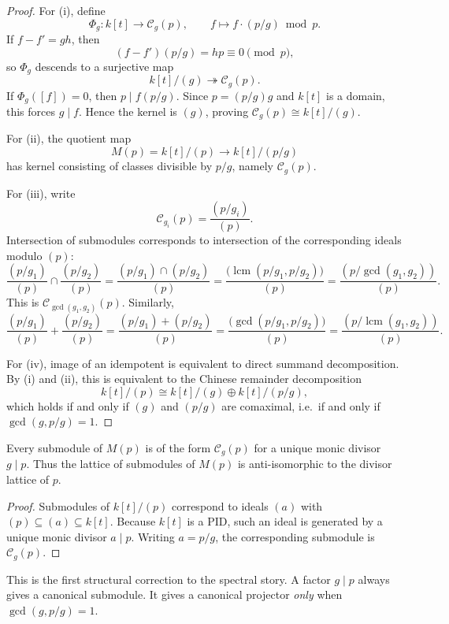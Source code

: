 \begin{proof}
For \textup{(i)}, define
\[
\Phi_g\colon k[t]\to \mathcal C_g(p),\qquad f\mapsto f\cdot (p/g)\bmod p.
\]
If \(f-f'=gh\), then
\[
(f-f')(p/g)=hp\equiv 0\pmod p,
\]
so \(\Phi_g\) descends to a surjective map
\[
k[t]/(g)\twoheadrightarrow \mathcal C_g(p).
\]
If \(\Phi_g([f])=0\), then \(p\mid f(p/g)\). Since \(p=(p/g)g\) and \(k[t]\) is a domain, this forces \(g\mid f\).
Hence the kernel is \((g)\), proving \(\mathcal C_g(p)\cong k[t]/(g)\).

For \textup{(ii)}, the quotient map
\[
M(p)=k[t]/(p)\longrightarrow k[t]/(p/g)
\]
has kernel consisting of classes divisible by \(p/g\), namely \(\mathcal C_g(p)\).

For \textup{(iii)}, write
\[
\mathcal C_{g_i}(p)=\frac{(p/g_i)}{(p)}.
\]
Intersection of submodules corresponds to intersection of the corresponding ideals modulo \((p)\):
\[
\frac{(p/g_1)}{(p)}\cap \frac{(p/g_2)}{(p)}
=\frac{(p/g_1)\cap (p/g_2)}{(p)}
=\frac{\bigl(\operatorname{lcm}(p/g_1,p/g_2)\bigr)}{(p)}
=\frac{(p/\gcd(g_1,g_2))}{(p)}.
\]
This is \(\mathcal C_{\gcd(g_1,g_2)}(p)\).
Similarly,
\[
\frac{(p/g_1)}{(p)}+\frac{(p/g_2)}{(p)}
=\frac{(p/g_1)+(p/g_2)}{(p)}
=\frac{\bigl(\gcd(p/g_1,p/g_2)\bigr)}{(p)}
=\frac{(p/\operatorname{lcm}(g_1,g_2))}{(p)}.
\]

For \textup{(iv)}, image of an idempotent is equivalent to direct summand decomposition.
By \textup{(i)} and \textup{(ii)}, this is equivalent to the Chinese remainder decomposition
\[
k[t]/(p)\cong k[t]/(g)\oplus k[t]/(p/g),
\]
which holds if and only if \((g)\) and \((p/g)\) are comaximal, i.e.\ if and only if \(\gcd(g,p/g)=1\).
\end{proof}

\begin{corollary}
\ClaimStatusProvedHere
Every submodule of \(M(p)\) is of the form \(\mathcal C_g(p)\) for a unique monic divisor \(g\mid p\).
Thus the lattice of submodules of \(M(p)\) is anti-isomorphic to the divisor lattice of \(p\).
\end{corollary}

\begin{proof}
Submodules of \(k[t]/(p)\) correspond to ideals \((a)\) with \((p)\subseteq (a)\subseteq k[t]\).
Because \(k[t]\) is a PID, such an ideal is generated by a unique monic divisor \(a\mid p\).
Writing \(a=p/g\), the corresponding submodule is \(\mathcal C_g(p)\).
\end{proof}

\begin{remark}
This is the first structural correction to the spectral story.
A factor \(g\mid p\) always gives a canonical submodule.
It gives a canonical projector \emph{only} when \(\gcd(g,p/g)=1\).
\end{remark}

